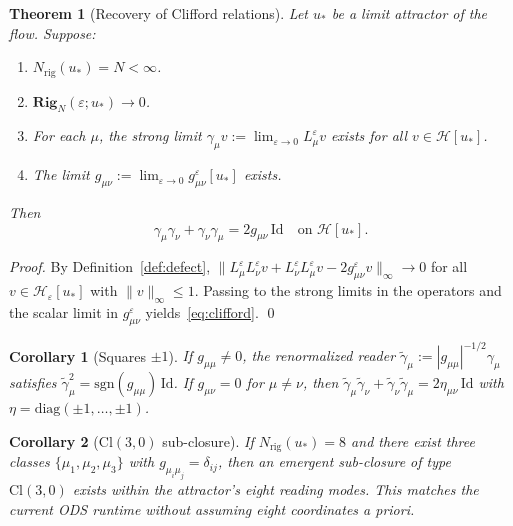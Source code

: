 \documentclass[11pt,a4paper]{article}
\newtheorem{theorem}{Theorem}
\newtheorem{corollary}{Corollary}
\newcommand{\HH}{\mathcal{H}}
\begin{document}
\begin{theorem}[Recovery of Clifford relations]
\label{thm:clifford}
Let $u_*$ be a limit attractor of the flow. Suppose:
\begin{enumerate}
\item $N_{\mathrm{rig}}(u_*) = N < \infty$.
\item $\mathbf{Rig}_N(\varepsilon; u_*) \to 0$.
\item For each $\mu$, the strong limit
$\gamma_\mu v := \lim_{\varepsilon\to0} L_\mu^\varepsilon v$
exists for all $v \in \HH[u_*]$.
\item The limit $g_{\mu\nu} := \lim_{\varepsilon\to0}
g_{\mu\nu}^\varepsilon[u_*]$ exists.
\end{enumerate}
Then
\begin{equation}\label{eq:clifford}
\gamma_\mu\gamma_\nu + \gamma_\nu\gamma_\mu
= 2g_{\mu\nu}\,\mathrm{Id}
\quad \text{on } \HH[u_*].
\end{equation}
\end{theorem}
\begin{proof}
By Definition~\ref{def:defect},
$\|L_\mu^\varepsilon L_\nu^\varepsilon v
+ L_\nu^\varepsilon L_\mu^\varepsilon v
- 2g_{\mu\nu}^\varepsilon v\|_\infty \to 0$
for all $v \in \HH_\varepsilon[u_*]$ with $\|v\|_\infty \le 1$.
Passing to the strong limits in the operators and the scalar limit
in $g_{\mu\nu}^\varepsilon$ yields~\eqref{eq:clifford}. \qed
\end{proof}

\begin{corollary}[Squares $\pm 1$]
\label{cor:squares}
If $g_{\mu\mu} \ne 0$, the renormalized reader
$\widetilde\gamma_\mu := |g_{\mu\mu}|^{-1/2}\gamma_\mu$ satisfies
$\widetilde\gamma_\mu^2 = \mathrm{sgn}(g_{\mu\mu})\,\mathrm{Id}$.
If $g_{\mu\nu} = 0$ for $\mu \ne \nu$, then
$\widetilde\gamma_\mu\widetilde\gamma_\nu
+ \widetilde\gamma_\nu\widetilde\gamma_\mu
= 2\eta_{\mu\nu}\,\mathrm{Id}$
with $\eta = \mathrm{diag}(\pm1,\ldots,\pm1)$.
\end{corollary}

\begin{corollary}[$\mathrm{Cl}(3,0)$ sub-closure]
\label{cor:cl30}
If $N_{\mathrm{rig}}(u_*) = 8$ and there exist three classes
$\{\mu_1,\mu_2,\mu_3\}$ with $g_{\mu_i\mu_j} = \delta_{ij}$,
then an emergent sub-closure of type $\mathrm{Cl}(3,0)$ exists
within the attractor's eight reading modes.
This matches the current ODS runtime without assuming eight
coordinates \emph{a priori}.
\end{corollary}
\end{document}
